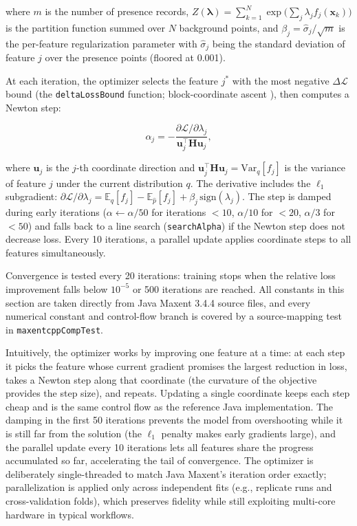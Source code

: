 \documentclass[10pt,letterpaper]{article}
\begin{document}
where \(m\) is the number of presence records, \(Z(\boldsymbol{\lambda})
= \sum_{k=1}^{N} \exp\!\bigl(\sum_j \lambda_j f_j(\mathbf{x}_k)\bigr)\)
is the partition function summed over \(N\) background points, and
\(\beta_j = \hat\sigma_j / \sqrt{m}\) is the per-feature regularization
parameter with \(\hat\sigma_j\) being the standard deviation of feature
\(j\) over the presence points (floored at 0.001).

At each iteration, the optimizer selects the feature \(j^*\) with the
most negative \(\Delta\mathcal{L}\) bound (the \texttt{deltaLossBound}
function; block-coordinate ascent \cite{Tseng2001}), then computes a
Newton step:

\[
\alpha_j = -\frac{\partial \mathcal{L}/\partial \lambda_j}
{\mathbf{u}_j^\top \mathbf{H} \mathbf{u}_j},
\]

where \(\mathbf{u}_j\) is the \(j\)-th coordinate direction and
\(\mathbf{u}_j^\top \mathbf{H} \mathbf{u}_j = \mathrm{Var}_q[f_j]\) is
the variance of feature \(j\) under the current distribution \(q\). The
derivative includes the \(\ell_1\) subgradient:
\(\partial \mathcal{L}/\partial \lambda_j = \mathbb{E}_q[f_j] -
\mathbb{E}_{\hat p}[f_j] + \beta_j \,\mathrm{sign}(\lambda_j)\). The
step is damped during early iterations (\(\alpha \leftarrow \alpha/50\)
for iterations \(<10\), \(\alpha/10\) for \(<20\), \(\alpha/3\) for
\(<50\)) and falls back to a line search (\texttt{searchAlpha}) if the
Newton step does not decrease loss. Every 10 iterations, a parallel
update applies coordinate steps to all features simultaneously.

Convergence is tested every 20 iterations: training stops when the
relative loss improvement falls below \(10^{-5}\) or 500 iterations are
reached. All constants in this section are taken directly from Java
Maxent 3.4.4 source files, and every numerical constant and control-flow
branch is covered by a source-mapping test in
\texttt{maxentcppCompTest}.

Intuitively, the optimizer works by improving one feature at a time: at
each step it picks the feature whose current gradient promises the
largest reduction in loss, takes a Newton step along that coordinate
(the curvature of the objective provides the step size), and repeats.
Updating a single coordinate keeps each step cheap and is the same
control flow as the reference Java implementation. The damping in the
first 50 iterations prevents the model from overshooting while it is
still far from the solution (the \(\ell_1\) penalty makes early
gradients large), and the parallel update every 10 iterations lets all
features share the progress accumulated so far, accelerating the tail of
convergence. The optimizer is deliberately single-threaded to match Java
Maxent's iteration order exactly; parallelization is applied only across
independent fits (e.g., replicate runs and cross-validation folds),
which preserves fidelity while still exploiting multi-core hardware in
typical workflows.
\end{document}
